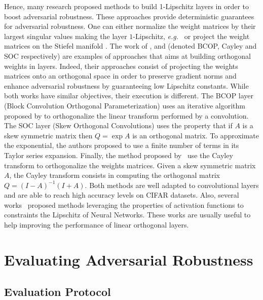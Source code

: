Hence, many research proposed methods to build 1-Lipschitz layers in order to boost adversarial robustness. These approaches provide deterministic guarantees for adversarial robustness. One can either normalize the weight matrices by their largest singular values making the layer $1$-Lipschitz, \emph{e.g.}~\citep{yoshida2017spectral,miyato2018spectral,farnia2018generalizable,anil2019sorting} or project the weight matrices on the Stiefel manifold \citep{li2019preventing,trockman2021orthogonalizing,skew2021sahil}.
The work of \citet{li2019preventing}, \citet{trockman2021orthogonalizing} and \citet{skew2021sahil} (denoted BCOP, Cayley and SOC respectively) are examples of approaches that aims at building orthogonal weights in layers.
Indeed, their approaches consist of projecting the weights matrices onto an orthogonal space in order to preserve gradient norms and enhance adversarial robustness by guaranteeing low Lipschitz constants. 
While both works have similar objectives, their execution is different.
The BCOP layer (Block Convolution Orthogonal Parameterization) uses an iterative algorithm proposed by \citet{bjorck1971iterative} to orthogonalize the linear transform performed by a convolution.
The SOC layer (Skew Orthogonal Convolutions) uses the property that if $A$ is a skew symmetric matrix then $Q=\exp{A}$ is an orthogonal matrix. To approximate the exponential, the authors proposed to use a finite number of terms in its Taylor series expansion.
Finally, the method proposed by~\citet{trockman2021orthogonalizing} use the Cayley transform to orthogonalize the weights matrices.
Given a skew symmetric matrix $A$, the Cayley transform consists in computing the orthogonal matrix $Q = (I - A)^{-1} (I + A)$. Both methods are well adapted to convolutional layers and are able to reach high accuracy levels on CIFAR datasets. Also, several works~\cite{anil2019sorting,singla2021householder,huang2021local} proposed methods leveraging the properties of activation functions to constraints the Lipschitz of Neural Networks. These works are usually useful to help  improving the performance of linear orthogonal layers.


\section{Evaluating Adversarial Robustness}

\subsection{Evaluation Protocol}

